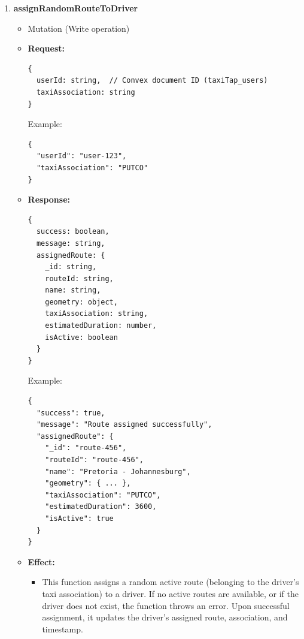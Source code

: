\documentclass[a4paper,12pt]{article}
\begin{document}
\begin{enumerate}
  \item \textbf{assignRandomRouteToDriver}
    \begin{itemize}
      \item Mutation (Write operation)
      \item \textbf{Request:}
      \begin{verbatim}
{
  userId: string,  // Convex document ID (taxiTap_users)
  taxiAssociation: string
}
      \end{verbatim}
      Example:
      \begin{verbatim}
{
  "userId": "user-123",
  "taxiAssociation": "PUTCO"
}
      \end{verbatim}
      \item \textbf{Response:}
      \begin{verbatim}
{
  success: boolean,
  message: string,
  assignedRoute: {
    _id: string,
    routeId: string,
    name: string,
    geometry: object,
    taxiAssociation: string,
    estimatedDuration: number,
    isActive: boolean
  }
}
      \end{verbatim}
      Example:
      \begin{verbatim}
{
  "success": true,
  "message": "Route assigned successfully",
  "assignedRoute": {
    "_id": "route-456",
    "routeId": "route-456",
    "name": "Pretoria - Johannesburg",
    "geometry": { ... },
    "taxiAssociation": "PUTCO",
    "estimatedDuration": 3600,
    "isActive": true
  }
}
      \end{verbatim}
      \item \textbf{Effect:}
      \begin{itemize}
        \item This function assigns a random active route (belonging to the driver's taxi association) to a driver. If no active routes are available, or if the driver does not exist, the function throws an error. Upon successful assignment, it updates the driver's assigned route, association, and timestamp.
      \end{itemize}
    \end{itemize}


\end{enumerate}
\end{document}
